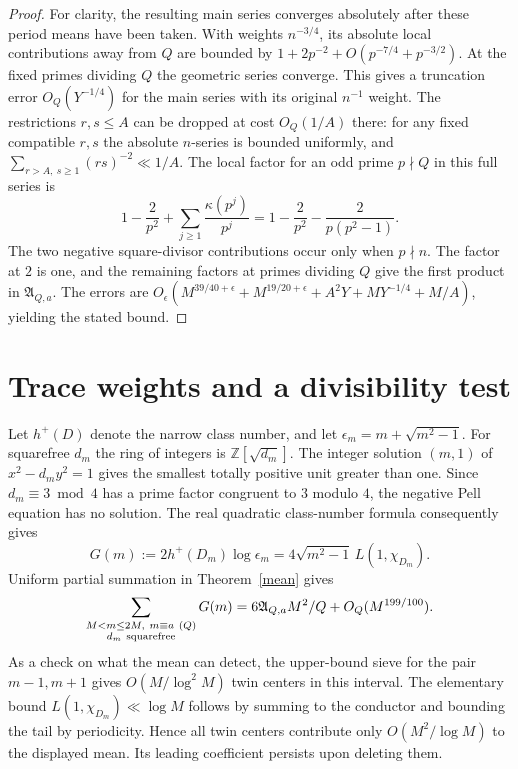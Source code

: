 \documentclass[11pt]{article}
\begin{document}
\begin{proof}
For clarity, the resulting main series converges absolutely after
these period means have been taken. With weights $n^{-3/4}$,
its absolute local contributions away from $Q$ are bounded by
$1+2p^{-2}+O(p^{-7/4}+p^{-3/2})$. At the fixed primes dividing
$Q$ the geometric series converge. This gives a truncation error
$O_Q(Y^{-1/4})$ for the main series with its original $n^{-1}$
weight. The restrictions $r,s\le A$ can be dropped at cost
$O_Q(1/A)$ there: for any fixed compatible $r,s$ the absolute
$n$-series is bounded uniformly, and
$\sum_{r>A,\ s\ge1}(rs)^{-2}\ll 1/A$.
The local factor for an odd prime $p\nmid Q$ in this full series is
\[
 1-\frac{2}{p^2}
 +\sum_{j\ge1}\frac{\kappa(p^j)}{p^j}
 =1-\frac{2}{p^2}-\frac{2}{p(p^2-1)}.
\]
The two negative square-divisor contributions occur only when
$p\nmid n$. The factor at $2$ is one, and the remaining factors
at primes dividing $Q$ give the first product in $\mathfrak A_{Q,a}$.
The errors are
$O_\epsilon(M^{39/40+\epsilon}+M^{19/20+\epsilon}+A^2Y
 +M Y^{-1/4}+M/A)$, yielding the stated bound.
\end{proof}

\section{Trace weights and a divisibility test}
Let $h^+(D)$ denote the narrow class number, and let
$\epsilon_m=m+\sqrt{m^2-1}$. For squarefree $d_m$ the ring of integers
is $\mathbb Z[\sqrt{d_m}]$. The integer solution $(m,1)$ of
$x^2-d_m y^2=1$ gives the smallest totally positive unit greater than
one. Since $d_m\equiv3\bmod4$ has a prime factor congruent to $3$
modulo $4$, the negative Pell equation has no solution. The real
quadratic class-number formula consequently gives
\[
 G(m):=2h^+(D_m)\log\epsilon_m
     =4\sqrt{m^2-1}\, L(1,\chi_{D_m}).
\]
Uniform partial summation in Theorem~\ref{mean} gives
\[
 \sum_{\substack{M<m\le2M,\ m\equiv a\ (Q)\\d_m\ {\rm squarefree}}}
 G(m)=6\mathfrak A_{Q,a}M^2/Q+O_Q(M^{199/100}).
\]
As a check on what the mean can detect, the upper-bound sieve for
the pair $m-1,m+1$ gives $O(M/\log^2 M)$ twin centers in this
interval. The elementary bound $L(1,\chi_{D_m})\ll\log M$ follows
by summing to the conductor and bounding the tail by periodicity.
Hence all twin centers contribute only $O(M^2/\log M)$ to the
displayed mean. Its leading coefficient persists upon deleting them.
\end{document}
